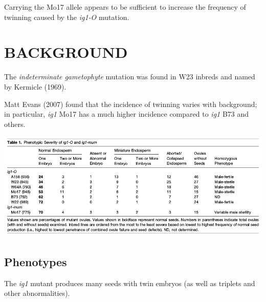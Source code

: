 \documentclass[a0,25pt]{sciposter}
\newlength{\figwidth}
\begin{document}
\begin{multicols}{3}
  Carrying the Mo17 allele appears to be sufficient to increase the frequency of twinning caused by the \textit{ig1-O} mutation.

  \section*{BACKGROUND}

  The \textit{indeterminate gametophyte} mutation was found in W23 inbreds and named by Kermicle (1969).

  Matt Evans (2007) found that the incidence of twinning varies with background; in particular, \textit{ig1} Mo17 has a much higher incidence compared to \textit{ig1} B73 and others.

  \begin{center}
    \includegraphics[width=\figwidth]{Evans-2007-Table-1.png}
  \end{center}

  \subsection*{Phenotypes}

  The \textit{ig1} mutant produces many seeds with twin embryos (as well as triplets and other abnormalities).


\end{multicols}
\end{document}
